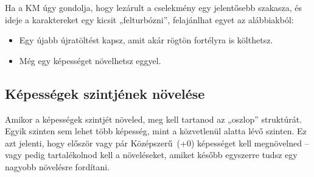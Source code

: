 Ha a KM úgy gondolja, hogy lezárult a cselekmény egy jelentősebb szakasza, és ideje a karaktereket egy kicsit „felturbózni”, felajánlhat egyet az alábbiakból:

\begin{itemize}
    \item Egy újabb újratöltést kapsz, amit akár rögtön fortélyra is költhetsz.
    \item Még egy képességet növelhetsz eggyel.
\end{itemize}

\newpage

\subsection{Képességek szintjének növelése}

Amikor a képességek szintjét növeled, meg kell tartanod az „oszlop” struktúrát. Egyik szinten sem lehet több képesség, mint a közvetlenül alatta lévő szinten. Ez azt jelenti, hogy először vagy pár Középszerű~(+0) képességet kell megnövelned -- vagy pedig tartalékolnod kell a növeléseket, amiket később egyszerre tudsz egy nagyobb növelésre fordítani.


\begin{center}
\end{center}

